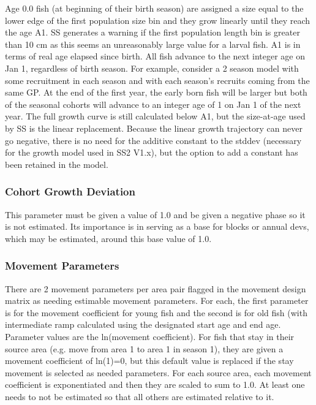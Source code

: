Age 0.0 fish (at beginning of their birth season) are assigned a size equal to the lower edge of the first population size bin and they grow linearly until they reach the age A1.  SS generates a warning if the first population length bin is greater than 10 cm as this seems an unreasonably large value for a larval fish.  A1 is in terms of real age elapsed since birth.  All fish advance to the next integer age on Jan 1, regardless of birth season.  For example, consider a 2 season model with some recruitment in each season and with each season’s recruits coming from the same GP.  At the end of the first year, the early born fish will be larger but both of the seasonal cohorts will advance to an integer age of 1 on Jan 1 of the next year.  The full growth curve is still calculated below A1, but the size-at-age used by SS is the linear replacement.  Because the linear growth trajectory can never go negative, there is no need for the additive constant to the stddev (necessary for the growth model used in SS2 V1.x), but the option to add a constant has been retained in the model.

\subsubsection{Cohort Growth Deviation}
This parameter must be given a value of 1.0 and be given a negative phase so it is not estimated.  Its importance is in serving as a base for blocks or annual devs, which may be estimated, around this base value of 1.0.

\subsubsection{Movement Parameters}
There are 2 movement parameters per area pair flagged in the movement design matrix as needing estimable movement parameters.  For each, the first parameter is for the movement coefficient for young fish and the second is for old fish (with intermediate ramp calculated using the designated start age and end age.  Parameter values are the ln(movement coefficient).  For fish that stay in their source area (e.g. move from area 1 to area 1 in season 1), they are given a movement coefficient of ln(1)=0, but this default value is replaced if the stay movement is selected as needed parameters.  For each source area, each movement coefficient is exponentiated and then they are scaled to sum to 1.0.  At least one needs to not be estimated so that all others are estimated relative to it.

